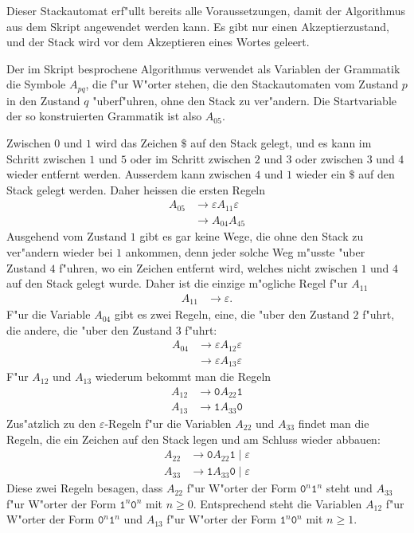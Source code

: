 \begin{loesung}
Dieser Stackautomat erf"ullt bereits alle Voraussetzungen, damit
der Algorithmus aus dem Skript angewendet werden kann. Es gibt nur
einen Akzeptierzustand, und der Stack wird vor dem Akzeptieren
eines Wortes geleert.

Der im Skript besprochene Algorithmus verwendet als Variablen der
Grammatik die Symbole $A_{pq}$, die f"ur W"orter stehen, die den
Stackautomaten vom Zustand $p$ in den Zustand $q$ "uberf"uhren, ohne
den Stack zu ver"andern. Die Startvariable der so konstruierten Grammatik
ist also $A_{05}$.

Zwischen $0$ und $1$ wird das Zeichen $\texttt{\$}$ auf den Stack gelegt,
und es kann im Schritt zwischen $1$ und $5$ oder im Schritt zwischen $2$
und $3$ oder zwischen $3$ und $4$ wieder entfernt werden. Ausserdem
kann zwischen $4$ und $1$ wieder ein $\texttt{\$}$ auf den Stack gelegt
werden. Daher heissen die ersten Regeln
\begin{align*}
A_{05}&\to \varepsilon A_{11}\varepsilon \\
      &\to A_{04}A_{45}
\end{align*}
Ausgehend vom Zustand $1$ gibt es gar keine Wege, die ohne den Stack zu
ver"andern wieder bei $1$ ankommen, denn jeder solche Weg m"usste "uber
Zustand $4$ f"uhren, wo ein Zeichen entfernt wird, welches nicht zwischen
$1$ und $4$ auf den Stack gelegt wurde. Daher ist die einzige m"ogliche
Regel f"ur $A_{11}$
\begin{align*}
A_{11}&\to\varepsilon.
\end{align*}
F"ur die Variable $A_{04}$ gibt es zwei Regeln, eine, die "uber den
Zustand $2$ f"uhrt, die andere, die "uber den Zustand $3$ f"uhrt:
\begin{align*}
A_{04}&\to \varepsilon A_{12}\varepsilon\\
      &\to \varepsilon A_{13}\varepsilon
\end{align*}
F"ur $A_{12}$ und $A_{13}$ wiederum bekommt man die Regeln
\begin{align*}
A_{12}&\to\texttt{0} A_{22}\texttt{1}\\
A_{13}&\to\texttt{1} A_{33}\texttt{0}
\end{align*}
Zus"atzlich zu den $\varepsilon$-Regeln f"ur die Variablen $A_{22}$ und $A_{33}$
findet man die Regeln, die ein Zeichen auf den Stack legen und am
Schluss wieder abbauen:
\begin{align*}
A_{22}&\to \texttt{0}A_{22}\texttt{1}\;|\;\varepsilon\\
A_{33}&\to \texttt{1}A_{33}\texttt{0}\;|\;\varepsilon
\end{align*}
Diese zwei Regeln besagen, dass $A_{22}$ f"ur W"orter der Form
$\texttt{0}^n\texttt{1}^n$ steht und $A_{33}$ f"ur W"orter der Form
$\texttt{1}^n\texttt{0}^n$ mit $n\ge 0$.
Entsprechend steht die Variablen $A_{12}$  f"ur W"orter der Form
$\texttt{0}^n\texttt{1}^n$ und $A_{13}$ f"ur W"orter der Form
$\texttt{1}^n\texttt{0}^n$ mit $n\ge 1$.


\end{loesung}
